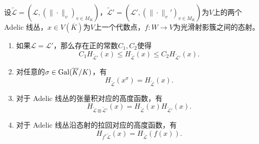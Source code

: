 \begin{proposition}
设$\widetilde{\mathscr{L}} = (\mathscr{L}, (\|\cdot\|_v)_{v\in M_K})$，$\widetilde{\mathscr{L}}' = (\mathscr{L}', (\|\cdot\|_v')_{v\in M_K})$为$V$上的两个 Adelic 线丛，$x\in V(\overline{K})$为$V$上一个代数点，$f: W \longrightarrow V$为光滑射影簇之间的态射。
\begin{enumerate}
\item 如果$\mathscr{L} = \mathscr{L}'$，那么存在正的常数$C_1,C_2$使得
\begin{equation}
C_1H_{\widetilde{\mathscr{L}}'}(x) \leqslant H_{\widetilde{\mathscr{L}}}(x) \leqslant C_2 H_{\widetilde{\mathscr{L}}'}(x).
\end{equation}
\item 对任意的$\sigma \in \operatorname{Gal}(\overline{K}/K)$，有
\begin{equation}
H_{\widetilde{\mathscr{L}}}(x^{\sigma}) = H_{\widetilde{\mathscr{L}}}(x).
\end{equation}
\item 对于 Adelic 线丛的张量积对应的高度函数，有
\begin{equation}
H_{\widetilde{\mathscr{L}}\otimes \widetilde{\mathscr{L}}'}(x) = H_{\widetilde{\mathscr{L}}}(x) H_{\widetilde{\mathscr{L}}'}(x).
\end{equation}
\item 对于 Adelic 线丛沿态射的拉回对应的高度函数，有
\begin{equation}
H_{f^*\widetilde{\mathscr{L}}}(x) = H_{\widetilde{\mathscr{L}}}(f(x)).
\end{equation}
\end{enumerate}
\end{proposition}




